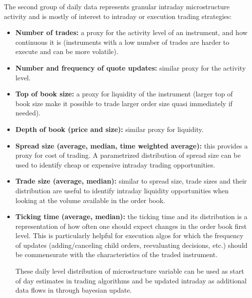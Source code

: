 The second group of daily data represents granular intraday microstructure activity and is mostly of interest to intraday or execution trading strategies:
        \begin{itemize}
        \item \textbf{Number of trades:} a proxy for the activity level of an instrument, and how continuous it is (instruments with a low number of trades are harder to execute and can be more volatile). 
        \item \textbf{Number and frequency of quote updates:} similar proxy for the activity level.
        \item \textbf{Top of book size:} a proxy for liquidity of the instrument (larger top of book size make it possible to trade larger order size quasi immediately if needed).
        \item \textbf{Depth of book (price and size):} similar proxy for liquidity.
        \item \textbf{Spread size (average, median, time weighted average):} this provides a proxy for cost of trading. A parametrized distribution of spread size can be used to identify cheap or expensive intraday trading opportunities.
        \item \textbf{Trade size (average, median):} similar to spread size, trade sizes and their distribution are useful to identify intraday liquidity opportunities when looking at the volume available in the order book.
        \item \textbf{Ticking time (average, median):} the ticking time and its distribution is a representation of how often one should expect changes in the order book first level. This is particularly helpful for execution algos for which the frequency of updates (adding/canceling child orders, reevaluating decisions, etc.) should be commensurate with the characteristics of the traded instrument.
        
        These daily level distribution of microstructure variable can be used as start of day estimates in trading algorithms and be updated intraday as additional data flows in through bayesian update.
        \end{itemize}


